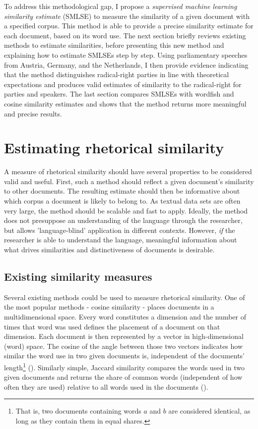 \documentclass{article}
\begin{document}
To address this methodological gap, I propose a \textit{supervised machine learning similarity estimate} (SMLSE) to measure the similarity of a given document with a specified corpus. This method is able to provide a precise similarity estimate for each document, based on its word use. The next section briefly reviews existing methods to estimate similarities, before presenting this new method and explaining how to estimate SMLSEs step by step. Using parliamentary speeches from Austria, Germany, and the Netherlands, I then provide evidence indicating that the method distinguishes radical-right parties in line with theoretical expectations and produces valid estimates of similarity to the radical-right for parties and speakers. The last section compares SMLSEs with wordfish and cosine similarity estimates and shows that the method returns more meaningful and precise results.\par


\section{Estimating rhetorical similarity}

A measure of rhetorical similarity should have several properties to be considered valid and useful. First, such a method should reflect a given document's similarity to other documents. The resulting estimate should then be informative about which corpus a document is likely to belong to. As textual data sets are often very large, the method should be scalable and fast to apply. Ideally, the method does not presuppose an understanding of the language through the researcher, but allows 'language-blind' application in different contexts. However, \textit{if} the researcher is able to understand the language, meaningful information about what drives similarities and distinctiveness of documents is desirable. \par


\subsection{Existing similarity measures}

Several existing methods could be used to measure rhetorical similarity. One of the most popular methods - cosine similarity - places documents in a multidimensional space. Every word constitutes a dimension and the number of times that word was used defines the placement of a document on that dimension. Each document is then represented by a vector in high-dimensional (word) space. The cosine of the angle between those two vectors indicates how similar the word use in two given documents is, independent of the documents' length\footnote{That is, two documents containing words $a$ and $b$ are considered identical, as long as they contain them in equal shares.} (\cite{Similarity2007a}).  Similarly simple, Jaccard similarity compares the words used in two given documents and returns the share of common words (independent of how often they are used) relative to all words used in the documents (\cite{Jaccard1912}).\par
\end{document}
